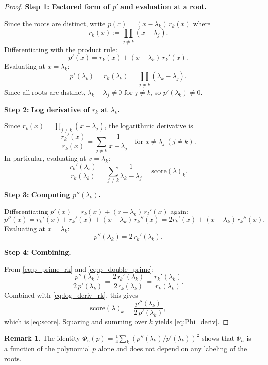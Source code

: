 \documentclass[12pt]{article}
\theoremstyle{definition}
\newtheorem{remark}[theorem]{Remark}
\newcommand{\score}{\mathrm{score}}
\begin{document}
\begin{proof}
\textbf{Step 1: Factored form of $p'$ and evaluation at a root.}

Since the roots are distinct, write $p(x) = (x - \lambda_k)\,r_k(x)$ where
\[
  r_k(x) := \prod_{j \neq k} (x - \lambda_j).
\]
Differentiating with the product rule:
\[
  p'(x) = r_k(x) + (x - \lambda_k)\,r_k'(x).
\]
Evaluating at $x = \lambda_k$:
\begin{equation}\label{eq:p_prime_rk}
  p'(\lambda_k) = r_k(\lambda_k) = \prod_{j \neq k}(\lambda_k - \lambda_j).
\end{equation}
Since all roots are distinct, $\lambda_k - \lambda_j \neq 0$ for $j \neq k$, so $p'(\lambda_k) \neq 0$.

\textbf{Step 2: Log derivative of $r_k$ at $\lambda_k$.}

Since $r_k(x) = \prod_{j \neq k}(x - \lambda_j)$, the logarithmic derivative is
\[
  \frac{r_k'(x)}{r_k(x)} = \sum_{j \neq k} \frac{1}{x - \lambda_j}
  \quad \text{for } x \neq \lambda_j\ (j \neq k).
\]
In particular, evaluating at $x = \lambda_k$:
\begin{equation}\label{eq:log_deriv_rk}
  \frac{r_k'(\lambda_k)}{r_k(\lambda_k)} = \sum_{j \neq k} \frac{1}{\lambda_k - \lambda_j} = \score(\lambda)_k.
\end{equation}

\textbf{Step 3: Computing $p''(\lambda_k)$.}

Differentiating $p'(x) = r_k(x) + (x - \lambda_k)\,r_k'(x)$ again:
\[
  p''(x) = r_k'(x) + r_k'(x) + (x - \lambda_k)\,r_k''(x) = 2r_k'(x) + (x - \lambda_k)\,r_k''(x).
\]
Evaluating at $x = \lambda_k$:
\begin{equation}\label{eq:p_double_prime}
  p''(\lambda_k) = 2\,r_k'(\lambda_k).
\end{equation}

\textbf{Step 4: Combining.}

From \eqref{eq:p_prime_rk} and \eqref{eq:p_double_prime}:
\[
  \frac{p''(\lambda_k)}{2\,p'(\lambda_k)} = \frac{2\,r_k'(\lambda_k)}{2\,r_k(\lambda_k)} = \frac{r_k'(\lambda_k)}{r_k(\lambda_k)}.
\]
Combined with \eqref{eq:log_deriv_rk}, this gives
\[
  \score(\lambda)_k = \frac{p''(\lambda_k)}{2\,p'(\lambda_k)},
\]
which is \eqref{eq:score}. Squaring and summing over $k$ yields \eqref{eq:Phi_deriv}.
\end{proof}

\begin{remark}
The identity $\Phi_n(p) = \tfrac{1}{4}\sum_k (p''(\lambda_k)/p'(\lambda_k))^2$ shows that $\Phi_n$ is a function of the polynomial $p$ alone and does not depend on any labeling of the roots.
\end{remark}
\end{document}
